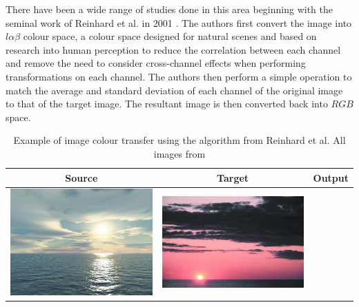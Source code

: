 There have been a wide range of studies done in this area beginning with the seminal work of Reinhard et al. in 2001 \cite{reinhard_2001_transfer}. The authors first convert the image into $l\alpha\beta$ colour space, a colour space designed for natural scenes and based on research into human perception to reduce the correlation between each channel and remove the need to consider cross-channel effects when performing transformations on each channel. The authors then perform a simple operation to match the average and standard deviation of each channel of the original image to that of the target image. The resultant image is then converted back into $RGB$ space.

\begin{table}[H]
    \centering
    \caption{Example of image colour transfer using the algorithm from Reinhard et al. All images from \cite{reinhard_2001_transfer} \label{tab:reinhard_demo}}
\begin{tabular}{|c|c|c|}
    \hline
    Source & Target & Output \\
    \hline
  \begin{minipage}{.29\textwidth}
    \includegraphics[width=\textwidth,height=\textheight,keepaspectratio]{images/reinhard_orig1}
  \end{minipage} & 
  \begin{minipage}{.29\textwidth}
    \includegraphics[width=\textwidth,height=\textheight,keepaspectratio]{images/reinhard_target1}

\end{minipage}
\end{tabular}
\end{table}
